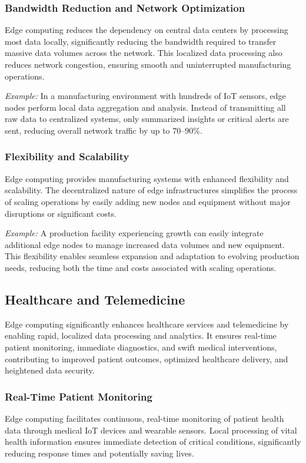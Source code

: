 \documentclass[runningheads]{llncs}
\begin{document}
\subsubsection{Bandwidth Reduction and Network Optimization}
Edge computing reduces the dependency on central data centers by processing most data locally, significantly reducing the bandwidth required to transfer massive data volumes across the network. This localized data processing also reduces network congestion, ensuring smooth and uninterrupted manufacturing operations.

\noindent\textit{Example:} In a manufacturing environment with hundreds of IoT sensors, edge nodes perform local data aggregation and analysis. Instead of transmitting all raw data to centralized systems, only summarized insights or critical alerts are sent, reducing overall network traffic by up to 70–90\%.

\subsubsection{Flexibility and Scalability}
Edge computing provides manufacturing systems with enhanced flexibility and scalability. The decentralized nature of edge infrastructures simplifies the process of scaling operations by easily adding new nodes and equipment without major disruptions or significant costs.

\noindent\textit{Example:} A production facility experiencing growth can easily integrate additional edge nodes to manage increased data volumes and new equipment. This flexibility enables seamless expansion and adaptation to evolving production needs, reducing both the time and costs associated with scaling operations.


\subsection{Healthcare and Telemedicine}

Edge computing significantly enhances healthcare services and telemedicine by enabling rapid, localized data processing and analytics. It ensures real-time patient monitoring, immediate diagnostics, and swift medical interventions, contributing to improved patient outcomes, optimized healthcare delivery, and heightened data security.

\subsubsection{Real-Time Patient Monitoring}
Edge computing facilitates continuous, real-time monitoring of patient health data through medical IoT devices and wearable sensors. Local processing of vital health information ensures immediate detection of critical conditions, significantly reducing response times and potentially saving lives.
\end{document}
